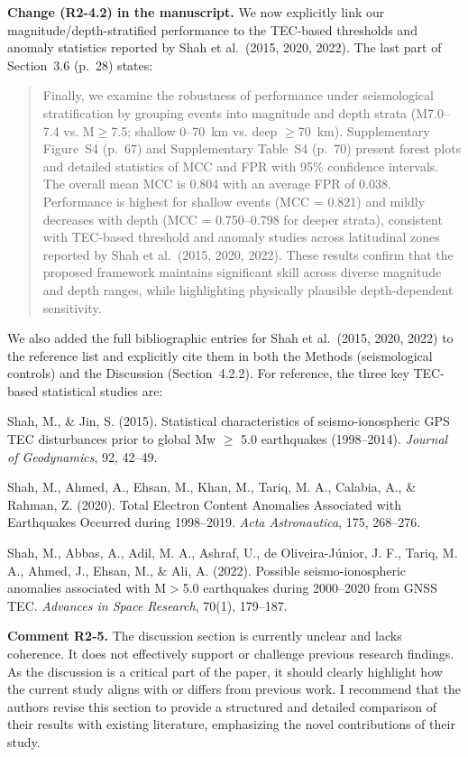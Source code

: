 \documentclass[12pt]{article}
\newcommand{\revcomment}[1]{\begingroup\color{commentcolor}#1\endgroup}
\newcommand{\revchange}[1]{\begingroup\color{changecolor}#1\endgroup}
\begin{document}
\revchange{%
\textbf{Change (R2-4.2) in the manuscript.}
We now explicitly link our magnitude/depth-stratified performance to the TEC-based thresholds and anomaly statistics reported by Shah et al.~(2015, 2020, 2022). The last part of Section~3.6 (p.~28) states:

\begin{quote}
Finally, we examine the robustness of performance under seismological stratification by grouping events into magnitude and depth strata (M7.0--7.4 vs. M$\ge$7.5; shallow 0--70~km vs. deep $\ge$70~km). Supplementary Figure~S4 (p.~67) and Supplementary Table~S4 (p.~70) present forest plots and detailed statistics of MCC and FPR with 95\% confidence intervals. The overall mean MCC is 0.804 with an average FPR of 0.038. Performance is highest for shallow events (MCC = 0.821) and mildly decreases with depth (MCC = 0.750--0.798 for deeper strata), consistent with TEC-based threshold and anomaly studies across latitudinal zones reported by Shah et al.~(2015, 2020, 2022). These results confirm that the proposed framework maintains significant skill across diverse magnitude and depth ranges, while highlighting physically plausible depth-dependent sensitivity.
\end{quote}

We also added the full bibliographic entries for Shah et al.~(2015, 2020, 2022) to the reference list and explicitly cite them in both the Methods (seismological controls) and the Discussion (Section~4.2.2). For reference, the three key TEC-based statistical studies are:

Shah, M., \& Jin, S. (2015). Statistical characteristics of seismo-ionospheric GPS TEC disturbances prior to global Mw $\ge$ 5.0 earthquakes (1998--2014). \emph{Journal of Geodynamics}, 92, 42--49.

Shah, M., Ahmed, A., Ehsan, M., Khan, M., Tariq, M. A., Calabia, A., \& Rahman, Z. (2020). Total Electron Content Anomalies Associated with Earthquakes Occurred during 1998--2019. \emph{Acta Astronautica}, 175, 268--276.

Shah, M., Abbas, A., Adil, M. A., Ashraf, U., de Oliveira-J{\'u}nior, J. F., Tariq, M. A., Ahmed, J., Ehsan, M., \& Ali, A. (2022). Possible seismo-ionospheric anomalies associated with M$>$5.0 earthquakes during 2000--2020 from GNSS TEC. \emph{Advances in Space Research}, 70(1), 179--187.
}

\bigskip

\revcomment{%
\textbf{Comment R2-5.} The discussion section is currently unclear and lacks coherence. It does not effectively support or challenge previous research findings. As the discussion is a critical part of the paper, it should clearly highlight how the current study aligns with or differs from previous work. I recommend that the authors revise this section to provide a structured and detailed comparison of their results with existing literature, emphasizing the novel contributions of their study.
}
\end{document}
